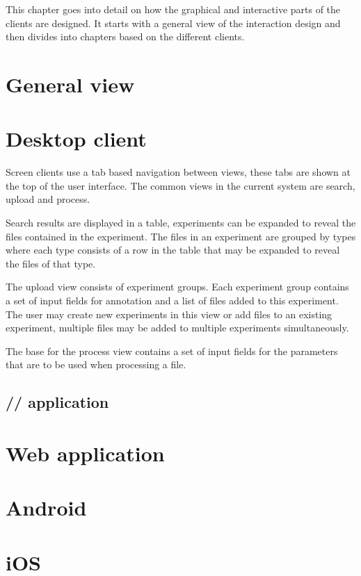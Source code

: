 
This chapter goes into detail on how the graphical and interactive parts of the clients are designed. It starts with a general view of the interaction design and then divides into chapters based on the different clients.

\section{General view}


\section{Desktop client}
Screen clients use a tab based navigation between views, these tabs are shown at the top of the user interface. The common views in the current system are search, upload and process.

Search results are displayed in a table, experiments can be expanded to reveal the files contained in the experiment. The files in an experiment are grouped by types where each type consists of a row in the table that may be expanded to reveal the files of that type.

The upload view consists of experiment groups. Each experiment group contains a set of input fields for annotation and a list of files added to this experiment. The user may create new experiments in this view or add files to an existing experiment, multiple files may be added to multiple experiments simultaneously.

The base for the process view contains a set of input fields for the parameters that are to be used when processing a file.

\FloatBarrier
\subsection{// application}


\FloatBarrier
\section{Web application}


\FloatBarrier
\section{Android}


\FloatBarrier
\section{iOS}

